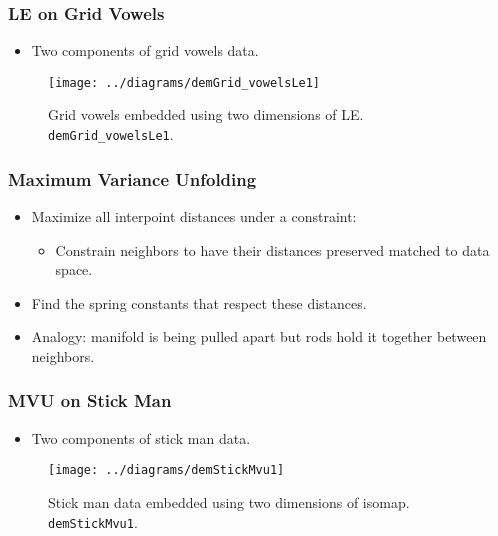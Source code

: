 \subsubsection{LE on Grid Vowels}
\begin{itemize}
\item Two components of grid vowels data.
\end{itemize}
\begin{figure}
  \begin{center}
    \texttt{[image: ../diagrams/demGrid\_vowelsLe1]}
    \caption{Grid vowels embedded using two dimensions of LE. \texttt{demGrid\_vowelsLe1}.}
  \end{center}
\end{figure}





\subsubsection{Maximum Variance Unfolding}
\begin{itemize}
\item Maximize all interpoint distances under a constraint:
  \begin{itemize}
  \item Constrain neighbors to have their distances preserved matched to data space.
  \end{itemize}
  
\item Find the spring constants that respect these distances.
\item Analogy: manifold is being pulled apart but rods hold it
  together between neighbors.
\end{itemize}




\subsubsection{MVU on Stick Man}
\begin{itemize}
\item Two components of stick man data.
\end{itemize}
\begin{figure}
  \begin{center}
    \texttt{[image: ../diagrams/demStickMvu1]}
    \caption{Stick man data embedded using two dimensions of isomap. \texttt{demStickMvu1}.}
  \end{center}
\end{figure}



